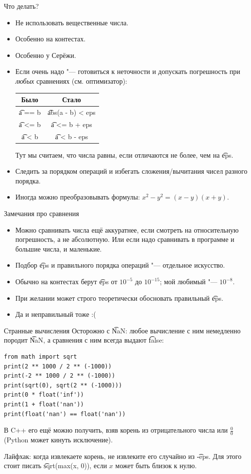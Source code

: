 \begin{frame}{Что делать?}
	\begin{itemize}
		\item
			Не использовать вещественные числа.
		\item
			Особенно на контестах.
		\item
			Особенно у Серёжи.
		\item
			Если очень надо "--- готовиться к неточности и допускать погрешность при \textit{любых} сравнениях (см. оптимизатор):
			\begin{center}
				\begin{tabular}{c|c}
					Было & Стало \\\hline
					\t{a == b} & \t{abs(a - b) < eps} \\
					\t{a <= b} & \t{a <= b + eps}  \\
					\t{a < b} & \t{a < b - eps} \\
				\end{tabular}
			\end{center}
			Тут мы считаем, что числа равны, если отличаются не более, чем на \t{eps}.
		\item
			Следить за порядком операций и избегать сложения/вычитания чисел разного порядка.
		\item
			Иногда можно преобразовывать формулы: $x^2-y^2=(x-y)(x+y)$.
	\end{itemize}
\end{frame}

\begin{frame}{Замечания про сравнения}
	\begin{itemize}
		\item
			Можно сравнивать числа ещё аккуратнее, если смотреть на относительную погрешность, а не абсолютную.
			Или если надо сравнивать в программе и большие числа, и маленькие.
		\item
			Подбор \t{eps} и правильного порядка операций "--- отдельное искусство.
		\item
			Обычно на контестах берут \t{eps} от $10^{-5}$ до $10^{-15}$; мой любимый "--- $10^{-8}$.
		\item
			При желании может строго теоретически обосновать правильный \t{eps}.
		\item
			\pause
			Да и неправильный тоже :(
	\end{itemize}
\end{frame}

\begin{frame}[fragile]{Странные вычисления}
	Осторожно с \t{NaN}: любое вычисление с ним немедленно породит \t{NaN}, а сравнения с ним всегда выдают \t{false}:
\begin{verbatim}
from math import sqrt
print(2 ** 1000 / 2 ** (-1000))
print(-2 ** 1000 / 2 ** (-1000))
print(sqrt(0), sqrt(2 ** (-1000)))
print(0 * float('inf'))
print(1 + float('nan'))
print(float('nan') == float('nan'))
\end{verbatim}
	В C++ его ещё можно получить, взяв корень из отрицательного числа или $\frac{0}{0}$ (Python может кинуть исключение).

	Лайфхак: когда извлекаете корень, не извлеките его случайно из \t{-eps}.
	Для этого стоит писать \t{sqrt(max(x, 0))}, если $x$ может быть близок к нулю.
\end{frame}
